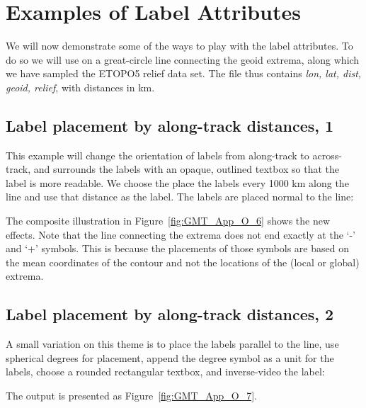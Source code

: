 \section{Examples of Label Attributes}

We will now demonstrate some of the ways to play with the label attributes.  To do so we
will use  on a great-circle line connecting the geoid extrema, along which
we have sampled the ETOPO5 relief data set.  The file  thus contains
{\it lon, lat, dist, geoid, relief}, with distances in km.

\subsection{Label placement by along-track distances, 1}

This example will change the orientation of labels from along-track to across-track, and
surrounds the labels with an opaque, outlined textbox so that the label is more readable.  We choose
the place the labels every 1000 km along the line and use that distance as the label.  The
labels are placed normal to the line:



\noindent
The composite illustration in Figure~\ref{fig:GMT_App_O_6} shows the new effects.  Note that
the line connecting the extrema does not end exactly at the `-' and `+' symbols.  This is
because the placements of those symbols are based on the mean coordinates of the contour and
not the locations of the (local or global) extrema.

\subsection{Label placement by along-track distances, 2}

A small variation on this theme is to place the labels parallel to the line, use
spherical degrees for placement, append the degree symbol as a unit for the
labels, choose a rounded rectangular textbox, and inverse-video the label:


\noindent
The output is presented as Figure~\ref{fig:GMT_App_O_7}.


